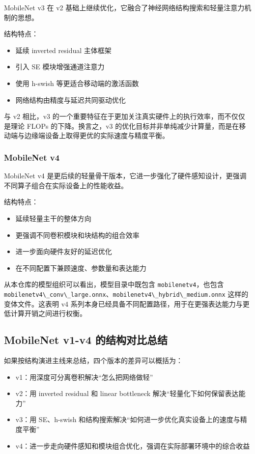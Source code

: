 MobileNet v3 在 v2
基础上继续优化，它融合了神经网络结构搜索和轻量注意力机制的思想。

结构特点：

\begin{itemize}
\tightlist
\item
  延续 inverted residual 主体框架
\item
  引入 SE 模块增强通道注意力
\item
  使用 h-swish 等更适合移动端的激活函数
\item
  网络结构由精度与延迟共同驱动优化
\end{itemize}

与 v2 相比，v3
的一个重要特征在于更加关注真实硬件上的执行效率，而不仅仅是理论 FLOPs
的下降。换言之，v3
的优化目标并非单纯减少计算量，而是在移动端与边缘端设备上取得更优的实际速度与精度平衡。

\subsubsection{MobileNet v4}\label{src-experiment-case2-h12}

MobileNet v4
是更后续的轻量骨干版本，它进一步强化了硬件感知设计，更强调不同算子组合在实际设备上的性能收益。

结构特点：

\begin{itemize}
\tightlist
\item
  延续轻量主干的整体方向
\item
  更强调不同卷积模块和块结构的组合效率
\item
  进一步面向硬件友好的延迟优化
\item
  在不同配置下兼顾速度、参数量和表达能力
\end{itemize}

从本仓库的模型组织可以看出，模型目录中既包含
\passthrough{\lstinline!mobilenetv4!}，也包含
\passthrough{\lstinline!mobilenetv4\_conv\_large.onnx!}、\passthrough{\lstinline!mobilenetv4\_hybrid\_medium.onnx!}
这样的变体文件。这表明 v4
系列本身已经具备不同配置路径，用于在更强表达能力与更低计算开销之间进行权衡。

\subsection{MobileNet v1-v4
的结构对比总结}\label{src-experiment-case2-h13}

如果按结构演进主线来总结，四个版本的差异可以概括为：

\begin{itemize}
\tightlist
\item
  v1：用深度可分离卷积解决``怎么把网络做轻''
\item
  v2：用 inverted residual 和 linear bottleneck
  解决``轻量化下如何保留表达能力''
\item
  v3：用 SE、h-swish
  和结构搜索解决``如何进一步优化真实设备上的速度与精度平衡''
\item
  v4：进一步走向硬件感知和模块组合优化，强调在实际部署环境中的综合收益
\end{itemize}

